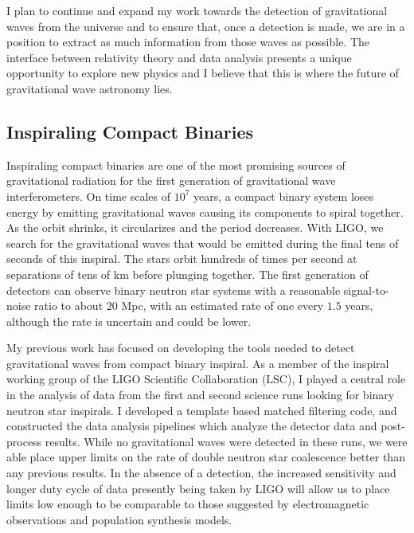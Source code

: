 I plan to continue and expand my work towards the detection of gravitational
waves from the universe and to ensure that, once a detection is made, we
are in a position to extract as much information from those waves as possible.
The interface between relativity theory and data analysis presents a unique
opportunity to explore new physics and I believe that this is where the future
of gravitational wave astronomy lies.

\subsection{Inspiraling Compact Binaries}

Inspiraling compact binaries are one of the most promising sources of
gravitational radiation for the first generation of gravitational wave
interferometers\cite{Belczynski:2002}. On time scales of $10^7$ years, a
compact binary system loses energy by emitting gravitational waves causing its
components to spiral together. As the orbit shrinks, it circularizes and the
period decreases. With LIGO, we search for the gravitational waves that would
be emitted during the final tens of seconds of this inspiral. The stars orbit
hundreds of times per second at separations of tens of km before plunging
together. The first generation of detectors can observe binary neutron star
systems with a reasonable signal-to-noise ratio to about 20 Mpc, with an
estimated rate of one every $1.5$ years\cite{Kalogera:2003tn}, although the
rate is uncertain and could be lower. 

My previous work has focused on developing the tools needed to detect
gravitational waves from compact binary inspiral. As a member of the inspiral
working group of the LIGO Scientific Collaboration (LSC), I played a central
role in the analysis of data from the first and second science runs looking
for binary neutron star inspirals. I developed a template based matched
filtering code\cite{Allen:2005fk}, and constructed the data analysis pipelines
which analyze the detector data and post-process
results\cite{Brown:2004pv,Brown:2005zs}. While no gravitational waves were
detected in these runs, we were able place upper limits on the rate of double
neutron star coalescence better than any previous
results\cite{Abbott:2003pj,Abbott:2005pe}. In the absence of a detection, the
increased sensitivity and longer duty cycle of data presently being taken by
LIGO will allow us to place limits low enough to be comparable to those
suggested by electromagnetic observations and population synthesis models.

